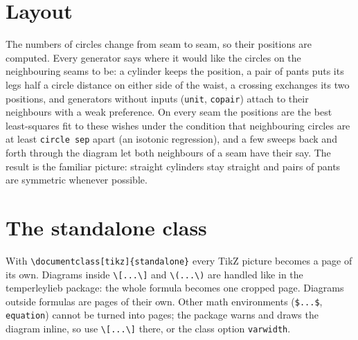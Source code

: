 \documentclass[11pt]{article}
\newenvironment{result}{\par\smallskip\noindent\hspace*{1em}}{\par\medskip}
\newcommand\opt[1]{\texttt{#1}}
\begin{document}
\begin{code}
\end{code}
\begin{result}
  \qquad
  \qquad
\end{result}

\section{Layout}

The numbers of circles change from seam to seam, so their positions are
computed. Every generator says where it would like the circles on the
neighbouring seams to be: a cylinder keeps the position, a pair of pants puts
its legs half a circle distance on either side of the waist, a crossing exchanges
its two positions, and generators without inputs (\opt{unit}, \opt{copair})
attach to their neighbours with a weak preference. On every seam the
positions are the best least-squares fit to these wishes under the condition
that neighbouring circles are at least \opt{circle sep} apart (an isotonic
regression), and a few sweeps back and forth through the diagram let both
neighbours of a seam have their say. The result is the familiar picture:
straight cylinders stay straight and pairs of pants are symmetric whenever
possible.

\section{The standalone class}

With \verb|\documentclass[tikz]{standalone}| every TikZ picture becomes a
page of its own. Diagrams inside \verb|\[...\]| and \verb|\(...\)| are
handled like in the \textsf{temperleylieb} package: the whole formula becomes
one cropped page. Diagrams outside formulas are pages of their own. Other
math environments (\verb|$...$|, \verb|equation|) cannot be turned into
pages; the package warns and draws the diagram inline, so use
\verb|\[...\]| there, or the class option \opt{varwidth}.
\end{document}
